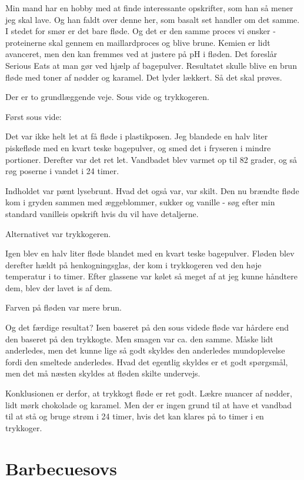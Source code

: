 \documentclass[
  letterpaper,
  DIV=11,
  numbers=noendperiod]{scrreprt}
\begin{document}
Min mand har en hobby med at finde interessante opskrifter, som han så
mener jeg skal lave. Og han faldt over denne her, som basalt set handler
om det samme. I stedet for smør er det bare fløde. Og det er den samme
proces vi ønsker - proteinerne skal gennem en maillardproces og blive
brune. Kemien er lidt avanceret, men den kan fremmes ved at justere på
pH i fløden. Det foreslår Serious Eats at man gør ved hjælp af
bagepulver. Resultatet skulle blive en brun fløde med toner af nødder og
karamel. Det lyder lækkert. Så det skal prøves.

Der er to grundlæggende veje. Sous vide og trykkogeren.

Først sous vide:

Det var ikke helt let at få fløde i plastikposen. Jeg blandede en halv
liter piskefløde med en kvart teske bagepulver, og smed det i fryseren i
mindre portioner. Derefter var det ret let. Vandbadet blev varmet op til
82 grader, og så røg poserne i vandet i 24 timer.

Indholdet var pænt lysebrunt. Hvad det også var, var skilt. Den nu
brændte fløde kom i gryden sammen med æggeblommer, sukker og vanille -
søg efter min standard vanilleis opskrift hvis du vil have detaljerne.

Alternativet var trykkogeren.

Igen blev en halv liter fløde blandet med en kvart teske bagepulver.
Fløden blev derefter hældt på henkogningsglas, der kom i trykkogeren ved
den høje temperatur i to timer. Efter glassene var kølet så meget af at
jeg kunne håndtere dem, blev der lavet is af dem.

Farven på fløden var mere brun.

Og det færdige resultat? Isen baseret på den sous videde fløde var
hårdere end den baseret på den trykkogte. Men smagen var ca. den samme.
Måske lidt anderledes, men det kunne lige så godt skyldes den anderledes
mundoplevelse fordi den smeltede anderledes. Hvad det egentlig skyldes
er et godt spørgsmål, men det må næsten skyldes at fløden skilte
undervejs.

Konklusionen er derfor, at trykkogt fløde er ret godt. Lækre nuancer af
nødder, lidt mørk chokolade og karamel. Men der er ingen grund til at
have et vandbad til at stå og bruge strøm i 24 timer, hvis det kan
klares på to timer i en trykkoger.

\hypertarget{barbecuesovs}{%
\section{Barbecuesovs}\label{barbecuesovs}}
\end{document}
